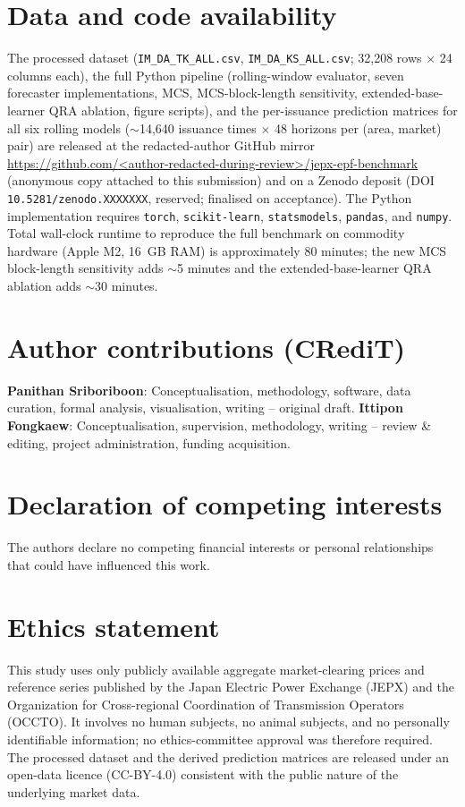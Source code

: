 \documentclass[review,3p,times,authoryear]{elsarticle}
\begin{document}
\section*{Data and code availability}
The processed dataset (\texttt{IM\_DA\_TK\_ALL.csv}, \texttt{IM\_DA\_KS\_ALL.csv}; 32{,}208 rows \(\times\) 24 columns each), the full Python pipeline (rolling-window evaluator, seven forecaster implementations, MCS, MCS-block-length sensitivity, extended-base-learner QRA ablation, figure scripts), and the per-issuance prediction matrices for all six rolling models (\(\sim\)14{,}640 issuance times \(\times\) 48 horizons per (area, market) pair) are released at the redacted-author GitHub mirror \url{https://github.com/<author-redacted-during-review>/jepx-epf-benchmark} (anonymous copy attached to this submission) and on a Zenodo deposit (DOI \texttt{10.5281/zenodo.XXXXXXX}, reserved; finalised on acceptance). The Python implementation requires \texttt{torch}, \texttt{scikit-learn}, \texttt{statsmodels}, \texttt{pandas}, and \texttt{numpy}. Total wall-clock runtime to reproduce the full benchmark on commodity hardware (Apple M2, 16~GB RAM) is approximately 80 minutes; the new MCS block-length sensitivity adds \(\sim\)5 minutes and the extended-base-learner QRA ablation adds \(\sim\)30 minutes.

\section*{Author contributions (CRediT)}
\textbf{Panithan Sriboriboon}: Conceptualisation, methodology, software, data curation, formal analysis, visualisation, writing -- original draft.
\textbf{Ittipon Fongkaew}: Conceptualisation, supervision, methodology, writing -- review \& editing, project administration, funding acquisition.

\section*{Declaration of competing interests}
The authors declare no competing financial interests or personal relationships that could have influenced this work.

\section*{Ethics statement}
This study uses only publicly available aggregate market-clearing prices and reference series published by the Japan Electric Power Exchange (JEPX) and the Organization for Cross-regional Coordination of Transmission Operators (OCCTO). It involves no human subjects, no animal subjects, and no personally identifiable information; no ethics-committee approval was therefore required. The processed dataset and the derived prediction matrices are released under an open-data licence (CC-BY-4.0) consistent with the public nature of the underlying market data.
\end{document}

